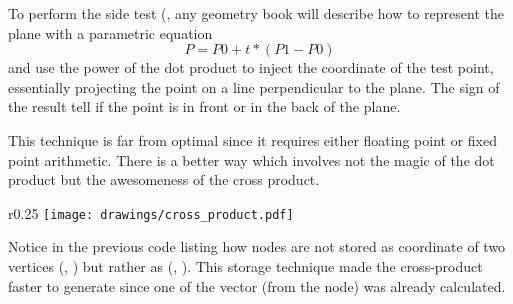 To perform the side test (, any geometry book will describe how to represent the plane with a parametric equation $$ P = P0 + t * (P1 - P0) $$
and use the power of the dot product to inject the coordinate of the test point, essentially projecting the point on a line perpendicular to the plane. The sign of the result tell if the point is in front or in the back of the plane.\\
\par
This technique is far from optimal since it requires either floating point or fixed point arithmetic. There is a better way which involves not the magic of the dot product but the awesomeness of the cross product.\\
\par
{}
\pagebreak


\begin{wrapfigure}[8]{r}{0.25\textwidth}
\centering
\texttt{[image: drawings/cross\_product.pdf]}
\end{wrapfigure}
Notice in the previous code listing how nodes are not stored as coordinate of two vertices (, ) but rather as (, ). This storage technique made the cross-product faster to generate since one of the vector (from the node) was already calculated.\\
\par


